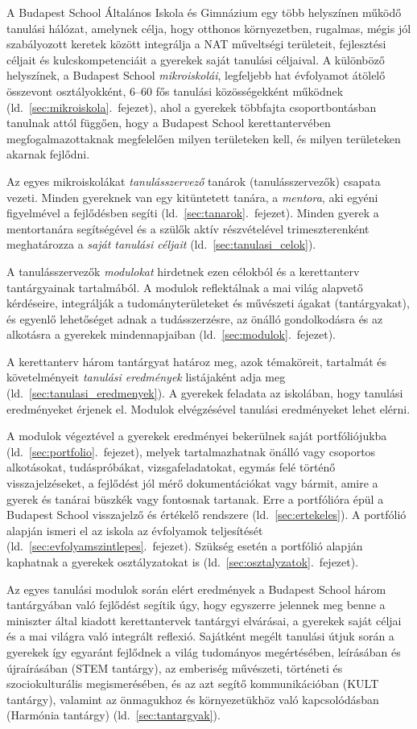 A Budapest School Általános Iskola és Gimnázium egy több helyszínen működő tanulási hálózat, amelynek célja, hogy otthonos környezetben, rugalmas, mégis jól szabályozott keretek között integrálja a NAT műveltségi területeit, fejlesztési céljait és kulcskompetenciáit a gyerekek saját tanulási céljaival. A különböző helyszínek, a Budapest School \emph{mikroiskolái}, legfeljebb hat évfolyamot átölelő összevont osztályokként, 6--60 fős tanulási közösségekként működnek (ld.~\ref{sec:mikroiskola}.~fejezet), ahol a gyerekek többfajta csoportbontásban tanulnak attól függően, hogy a Budapest School kerettantervében megfogalmazottaknak megfelelően milyen területeken kell, és milyen területeken akarnak fejlődni.

Az egyes mikroiskolákat \emph{tanulásszervező} tanárok (tanulásszervezők) csapata vezeti. Minden gyereknek van egy kitüntetett tanára, a \emph{mentora}, aki egyéni figyelmével a fejlődésben segíti (ld.~\ref{sec:tanarok}.~fejezet). Minden gyerek a mentortanára segítségével és a szülők aktív részvételével trimeszterenként meghatározza a \emph{saját tanulási céljait}
(ld.~\ref{sec:tanulasi_celok}).

A tanulásszervezők \emph{modulokat} hirdetnek ezen célokból és a kerettanterv tantárgyainak tartalmából. A modulok reflektálnak a mai világ alapvető kérdéseire, integrálják	a tudományterületeket és művészeti ágakat (tantárgyakat), és egyenlő lehetőséget adnak a tudásszerzésre, az önálló gondolkodásra és az alkotásra a gyerekek mindennapjaiban 
(ld.~\ref{sec:modulok}.~fejezet).

A kerettanterv három tantárgyat határoz meg, azok témaköreit, tartalmát és követelményeit \emph{tanulási eredmények} listájaként adja meg (ld.~\ref{sec:tanulasi_eredmenyek}). A gyerekek feladata az iskolában, hogy tanulási eredményeket érjenek el. Modulok elvégzésével tanulási eredményeket lehet elérni.

A modulok végeztével a gyerekek eredményei bekerülnek saját portfóliójukba (ld.~\ref{sec:portfolio}.~fejezet), melyek tartalmazhatnak önálló vagy csoportos alkotásokat, tudáspróbákat, vizsgafeladatokat, egymás felé történő visszajelzéseket, a fejlődést jól mérő dokumentációkat vagy bármit, amire a gyerek és tanárai büszkék vagy fontosnak tartanak. Erre a portfólióra épül a Budapest School visszajelző és értékelő rendszere (ld.~\ref{sec:ertekeles}). A portfólió alapján ismeri el az iskola az évfolyamok teljesítését (ld.~\ref{sec:evfolyamszintlepes}.~fejezet). Szükség esetén a portfólió alapján kaphatnak a gyerekek osztályzatokat is (ld.~\ref{sec:osztalyzatok}.~fejezet).

Az egyes tanulási modulok során elért eredmények a Budapest School három tantárgyában való fejlődést segítik úgy, hogy egyszerre jelennek meg benne a miniszter által kiadott kerettantervek tantárgyi elvárásai, a gyerekek saját céljai és a mai világra való integrált reflexió. Sajátként megélt tanulási útjuk során a gyerekek így egyaránt fejlődnek a világ tudományos megértésében, leírásában és újraírásában (STEM tantárgy), az emberiség művészeti, történeti és szociokulturális megismerésében, és az azt segítő kommunikáció\-ban (KULT tantárgy), valamint az önmagukhoz és környezetükhöz való kapcsolódásban (Harmónia tantárgy) 
(ld.~\ref{sec:tantargyak}).